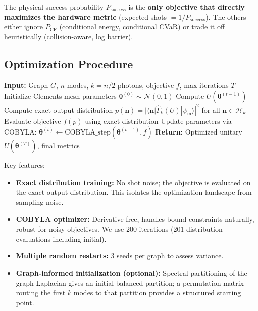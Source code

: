 The physical success probability $P_{\mathrm{success}}$ is the \textbf{only objective that directly maximizes the hardware metric} (expected shots $= 1/P_{\mathrm{success}}$). The others either ignore $P_{\mathrm{CF}}$ (conditional energy, conditional CVaR) or trade it off heuristically (collision-aware, log barrier).

\subsection{Optimization Procedure}

\begin{algorithm}[H]
\caption{Variational Collision-Aware Optimization}
\label{alg:variational}
\begin{algorithmic}
\STATE \textbf{Input:} Graph $G$, $n$ modes, $k=n/2$ photons, objective $f$, max iterations $T$
\STATE Initialize Clements mesh parameters $\boldsymbol{\theta}^{(0)} \sim \mathcal{N}(0,1)$
    \STATE Compute $U(\boldsymbol{\theta}^{(t-1)})$
    \STATE Compute exact output distribution $p(\mathbf{n}) = |\langle \mathbf{n} | \hat{\Gamma}_k(U) | \psi_{\mathrm{in}} \rangle|^2$ for all $\mathbf{n} \in \mathcal{H}_k$
    \STATE Evaluate objective $f(p)$ using exact distribution
    \STATE Update parameters via COBYLA: $\boldsymbol{\theta}^{(t)} \leftarrow \mathrm{COBYLA\_step}(\boldsymbol{\theta}^{(t-1)}, f)$
\ENDFOR
\STATE \textbf{Return:} Optimized unitary $U(\boldsymbol{\theta}^{(T)})$, final metrics
\end{algorithmic}
\end{algorithm}

Key features:
\begin{itemize}
\item \textbf{Exact distribution training:} No shot noise; the objective is evaluated on the exact output distribution. This isolates the optimization landscape from sampling noise.
\item \textbf{COBYLA optimizer:} Derivative-free, handles bound constraints naturally, robust for noisy objectives. We use 200 iterations (201 distribution evaluations including initial).
\item \textbf{Multiple random restarts:} 3 seeds per graph to assess variance.
\item \textbf{Graph-informed initialization (optional):} Spectral partitioning of the graph Laplacian gives an initial balanced partition; a permutation matrix routing the first $k$ modes to that partition provides a structured starting point.
\end{itemize}

